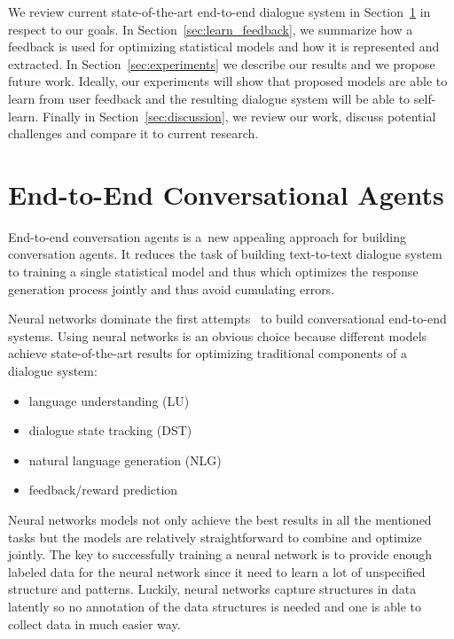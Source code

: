 \documentclass[11pt]{article}
\begin{document}
We review current state-of-the-art end-to-end dialogue system in Section~\ref{sec:e2end} in respect to our goals.
In Section~\ref{sec:learn_feedback}, we summarize how a feedback is used for optimizing statistical models and how it is represented and extracted. 
In Section~\ref{sec:experiments} we describe our results and we propose future work. 
Ideally, our experiments will show that proposed models are able to learn from user feedback and the resulting dialogue system will be able to self-learn.
Finally in Section~\ref{sec:discussion}, we review our work, discuss potential challenges and compare it to current research.


\section{End-to-End Conversational Agents}
\label{sec:e2end}
End-to-end conversation agents is a~new appealing approach for building conversation agents.
It reduces the task of building text-to-text dialogue system to training a single statistical model and thus which optimizes the response generation process jointly and thus avoid cumulating errors.

Neural networks dominate the first attempts~\cite{williams2016end,bordes_learning_2016,weston2015endtoend_prereq} to build conversational end-to-end systems.
Using neural networks is an obvious choice because different models achieve state-of-the-art results for optimizing traditional components of a dialogue system:
\begin{itemize}
    \item language understanding (LU)~\cite{mairesse_spoken_2009} 
    \item dialogue state tracking (DST)~\cite{williams_web-style_2014,henderson2014word,vodolan_hybrid_2015,platek_recurrent_2016}
    \item natural language generation (NLG)~\cite{dusek_sequence2sequence_2016,wen_networkbased_2016}
    \item feedback/reward prediction~\cite{su_learning_2015}
\end{itemize}
Neural networks models not only achieve the best results in all the mentioned tasks but the models are relatively straightforward to combine and optimize jointly.
The key to successfully training a neural network is to provide enough labeled data for the neural network since it need to learn a lot of unspecified structure and patterns.
Luckily, neural networks capture structures in data latently so no annotation of the data structures is needed and one is able to collect data in much easier way.
\end{document}
